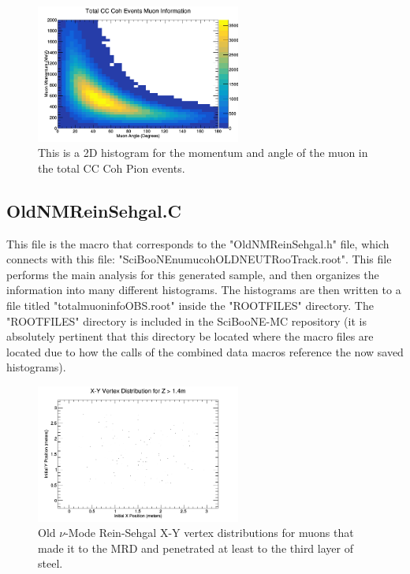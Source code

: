\documentclass[11pt]{article}
\begin{document}
\begin{figure}[H]
\centering
\includegraphics[width=0.6\textwidth]{NewNMBergerSehgalImages/9-TotalCCCohMuonInfoNMBS.png}
\caption{This is a 2D histogram for the momentum and angle of the muon in the total CC Coh Pion events.}
\end{figure}


\subsection{OldNMReinSehgal.C}
This file is the macro that corresponds to the "OldNMReinSehgal.h" file, which connects with this file: "SciBooNE\textunderscore numu\textunderscore coh\textunderscore OLDNEUT\textunderscore RooTrack.root". This file performs the main analysis for this generated sample, and then organizes the information into many different histograms. The histograms are then written to a file titled "totalmuoninfoOBS.root" inside the "ROOTFILES" directory. The "ROOTFILES" directory is included in the SciBooNE-MC repository (it is absolutely pertinent that this directory be located where the macro files are located due to how the calls of the combined data macros reference the now saved histograms).

\begin{figure}[H]
\centering
\includegraphics[width=0.6\textwidth]{OldNMReinSehgalImages/1-X-YVertexDistributionNMORS.png}
\caption{Old $\nu$-Mode Rein-Sehgal X-Y vertex distributions for muons that made it to the MRD and penetrated at least to the third layer of steel.}
\end{figure}
\end{document}
